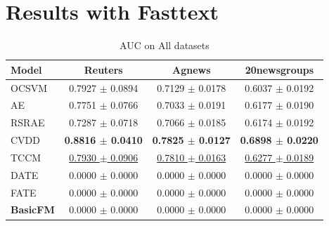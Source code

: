 \begin{table}[H]
\centering
\caption{AUC on Dbpedia14}
\label{tab:dbpedia14}
\end{table}


\section{Results with Fasttext}

\begin{table}[H]
\centering
\caption{AUC on All datasets}
\begin{tabular}{lccc}
\toprule
Model & Reuters & Agnews & 20newsgroups \\
\midrule
OCSVM & 0.7927 $\pm$ 0.0894 & 0.7129 $\pm$ 0.0178 & 0.6037 $\pm$ 0.0192 \\
AE & 0.7751 $\pm$ 0.0766 & 0.7033 $\pm$ 0.0191 & 0.6177 $\pm$ 0.0190 \\
RSRAE & 0.7287 $\pm$ 0.0718 & 0.7066 $\pm$ 0.0185 & 0.6174 $\pm$ 0.0192 \\
CVDD & \textbf{0.8816 $\pm$ 0.0410} & \textbf{0.7825 $\pm$ 0.0127} & \textbf{0.6898 $\pm$ 0.0220} \\
TCCM & \underline{0.7930 $\pm$ 0.0906} & \underline{0.7810 $\pm$ 0.0163} & \underline{0.6277 $\pm$ 0.0189} \\
DATE & 0.0000 $\pm$ 0.0000 & 0.0000 $\pm$ 0.0000 & 0.0000 $\pm$ 0.0000 \\
FATE & 0.0000 $\pm$ 0.0000 & 0.0000 $\pm$ 0.0000 & 0.0000 $\pm$ 0.0000 \\
\textbf{BasicFM} & 0.0000 $\pm$ 0.0000 & 0.0000 $\pm$ 0.0000 & 0.0000 $\pm$ 0.0000 \\
\bottomrule
\end{tabular}
\label{tab:ad_results}
\end{table}


